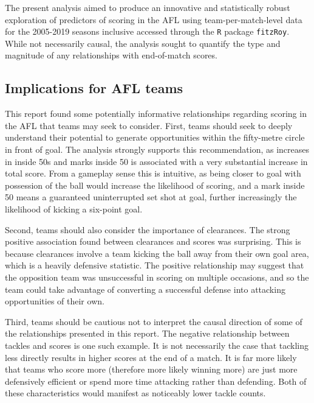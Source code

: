 \documentclass{article}
\begin{document}
The present analysis aimed to produce an innovative and statistically robust exploration of predictors of scoring in the AFL using team-per-match-level data for the 2005-2019 seasons inclusive accessed through the \texttt{R} package \texttt{fitzRoy}. While not necessarily causal, the analysis sought to quantify the type and magnitude of any relationships with end-of-match scores.

\hypertarget{implications-for-afl-teams}{%
\subsection{Implications for AFL teams}\label{implications-for-afl-teams}}

This report found some potentially informative relationships regarding scoring in the AFL that teams may seek to consider. First, teams should seek to deeply understand their potential to generate opportunities within the fifty-metre circle in front of goal. The analysis strongly supports this recommendation, as increases in inside 50s and marks inside 50 is associated with a very substantial increase in total score. From a gameplay sense this is intuitive, as being closer to goal with possession of the ball would increase the likelihood of scoring, and a mark inside 50 means a guaranteed uninterrupted set shot at goal, further increasingly the likelihood of kicking a six-point goal.

Second, teams should also consider the importance of clearances. The strong positive association found between clearances and scores was surprising. This is because clearances involve a team kicking the ball away from their own goal area, which is a heavily defensive statistic. The positive relationship may suggest that the opposition team was unsuccessful in scoring on multiple occasions, and so the team could take advantage of converting a successful defense into attacking opportunities of their own.

Third, teams should be cautious not to interpret the causal direction of some of the relationships presented in this report. The negative relationship between tackles and scores is one such example. It is not necessarily the case that tackling less directly results in higher scores at the end of a match. It is far more likely that teams who score more (therefore more likely winning more) are just more defensively efficient or spend more time attacking rather than defending. Both of these characteristics would manifest as noticeably lower tackle counts.
\end{document}
